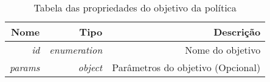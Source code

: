 \begin{table}[!htb]
    \centering
    \caption[Representação de um Objetivo]{Tabela das propriedades do objetivo da política
    \label{tab:objective-shape}}
    \begin{tabular}{rrr}
        \toprule
            Nome & Tipo & Descrição \\ 
        \midrule
            \textit{id} & \textit{enumeration} & Nome do objetivo \\
            \textit{params} & \textit{object} & Parâmetros do objetivo (Opcional) \\
        \bottomrule
    \end{tabular}
\end{table}

